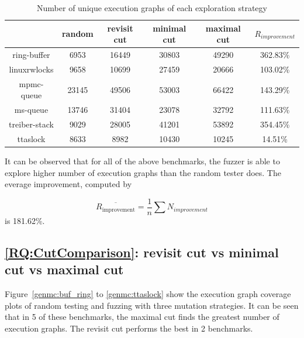 \begin{table}[h!]
	\centering
	\begin{tabular}{|c|cccc|c|}
		\hline
		\diagbox{Benchmark}{ Strategy} & random & revisit cut & minimal cut & maximal cut & $R_{improvement}$ \\ \hline
		ring-buffer                    & 6953   & 16449       & 30803       & 49290       & 362.83\%          \\ \hline
		linuxrwlocks                   & 9658   & 10699       & 27459       & 20666       & 103.02\%          \\ \hline
		mpmc-queue                     & 23145  & 49506       & 53003       & 66422       & 143.29\%          \\ \hline
		ms-queue                       & 13746  & 31404       & 23078       & 32792       & 111.63\%          \\ \hline
		treiber-stack                  & 9029   & 28005       & 41201       & 53892       & 354.45\%          \\ \hline
		ttaslock                       & 8633   & 8982        & 10430       & 10245       & 14.51\%           \\ \hline
	\end{tabular}
	\label{genmc:num-of-exe}
	\caption{Number of unique execution graphs of each exploration strategy}
\end{table}

It can be observed that for all of the above benchmarks, the fuzzer is able to explore higher number of execution graphs than the random tester does. The everage improvement, computed by


\[
	\overline{R_{\text{improvement}}} = \frac{1}{n} \sum N_{improvement}
\]
is 181.62\%.

\subsection{\ref*{RQ:CutComparison}: revisit cut vs minimal cut vs maximal cut }

Figure~\ref{genmc:buf_ring} to \ref{genmc:ttaslock} show the execution graph coverage plots of random testing and fuzzing with three mutation strategies. It can be seen that in 5 of these benchmarks, the maximal cut finds the greatest number of execution graphs. The revisit cut performs the best in 2 benchmarks.

